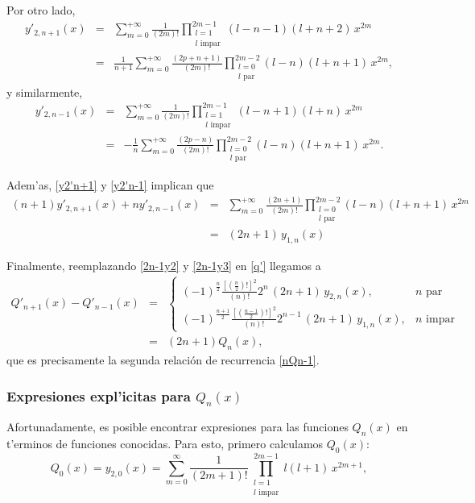 Por otro lado,
\begin{eqnarray}
y'_{2,n+1}(x)&=&\sum_{m= 0}^{+\infty}\frac{1}{(2m)!}
\prod_{\substack{l=1 \\ l \text{ impar}}}^{2m-1}
(l-n-1)(l+n+2)\,x^{2m} \\
&=&\frac{1}{n+1}\sum_{m= 0}^{+\infty}\frac{(2p+n+1)}{(2m)!}
\prod_{\substack{l=0 \\ l \text{ par}}}^{2m-2}
(l-n)(l+n+1)\,x^{2m}, \label{y2'n+1}
\end{eqnarray}
y similarmente, 
\begin{eqnarray}
y'_{2,n-1}(x)&=&\sum_{m= 0}^{+\infty}\frac{1}{(2m)!}
\prod_{\substack{l=1 \\ l \text{ impar}}}^{2m-1}
(l-n+1)(l+n)\,x^{2m} \\
&=&-\frac{1}{n}\sum_{m= 0}^{+\infty}\frac{(2p-n)}{(2m)!}
\prod_{\substack{l=0 \\ l \text{ par}}}^{2m-2}
(l-n)(l+n+1)\,x^{2m}. \label{y2'n-1}
\end{eqnarray}

Adem'as, \eqref{y2'n+1} y \eqref{y2'n-1} implican que
\begin{eqnarray}
(n+1)y'_{2,n+1}(x)+ny'_{2,n-1}(x)&=&\sum_{m= 0}^{+\infty}\frac{(2n+1)}{(2m)!}
\prod_{\substack{l=0 \\ l \text{ par}}}^{2m-2}
(l-n)(l+n+1)\,x^{2m}\\
&=&(2n+1)\,y_{1,n}(x) \label{2n-1y3}
\end{eqnarray}

Finalmente, reemplazando \eqref{2n-1y2} y \eqref{2n-1y3} en \eqref{q'} llegamos a
\begin{eqnarray}
Q'_{n+1}(x) - Q'_{n-1}(x)&=& 
\begin{cases}
	(-1)^{\frac{n}{2}}\frac{[(\frac{n}{2})!]^2}{(n)!} 2^{n} \,(2n+1)\,y_{2,n}(x) , & n \text{ par}\\
	(-1)^{\frac{n+1}{2}}\frac{\left[\left(\frac{n-1}{2}\right)!\right]^2}{(n)!}2^{n-1}\,(2n+1)\,y_{1,n}(x) , & n \text{ impar}
	\end{cases} \\  
	&=&(2n+1)Q_{n}(x),
\end{eqnarray}
que es precisamente la segunda relaci\'on de recurrencia \eqref{nQn-1}.

\subsubsection{Expresiones expl'icitas para $Q_n(x)$}

Afortunadamente, es posible encontrar expresiones para las funciones $Q_n(x)$ en t'erminos de funciones conocidas. Para esto, primero calculamos $Q_0(x)$:
\begin{equation}
Q_0(x)=y_{2,0}(x)=\sum_{m=0}^\infty\frac{1}{(2m+1)!}
\prod_{\substack{l=1 \\ l \text{ impar}}}^{2m-1}l(l+1)\,x^{2m+1},
\end{equation}

